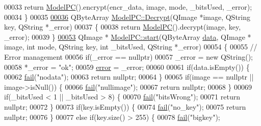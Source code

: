 \begin{DoxyCode}
00033     \textcolor{keywordflow}{return} \hyperlink{class_model_p_c_ae12ebe65ec973c02a0de4850a7c1e31c}{ModelPC}().encrypt(encr\_data, image, mode, \_bitsUsed, \_error);
00034 \}
00035 
\hypertarget{modelpc_8cpp_source_l00036}{}\hyperlink{class_model_p_c_ac245b9b6d618f421c0ccfa66d97ac905}{00036} QByteArray \hyperlink{class_model_p_c_ac245b9b6d618f421c0ccfa66d97ac905}{ModelPC::Decrypt}(QImage *image, QString key, QString *\_error)
00037 \{
00038     \textcolor{keywordflow}{return} \hyperlink{class_model_p_c_ae12ebe65ec973c02a0de4850a7c1e31c}{ModelPC}().decrypt(image, key, \_error);
00039 \}
\hypertarget{modelpc_8cpp_source_l00053}{}\hyperlink{class_model_p_c_a3cae34fd5bcb06e8c1f8cfe7961bd270}{00053} QImage * \hyperlink{class_model_p_c_a3cae34fd5bcb06e8c1f8cfe7961bd270}{ModelPC::start}(QByteArray \hyperlink{namespace_errors_dict_setup_adf4c30d205d29df7343e26f7c62b0685}{data}, QImage * image, \textcolor{keywordtype}{int} mode, QString key, \textcolor{keywordtype}{int} 
      \_bitsUsed, QString *\_error)
00054 \{
00055     \textcolor{comment}{// Error management}
00056     \textcolor{keywordflow}{if}(\_error == \textcolor{keyword}{nullptr})
00057         \_error = \textcolor{keyword}{new} QString();
00058     *\_error = \textcolor{stringliteral}{"ok"};
00059     \hyperlink{class_model_p_c_a4e5a9c0ca1f06fe5bc478b6bf248c37c}{error} = \_error;
00060 
00061     \textcolor{keywordflow}{if}(data.isEmpty()) \{
00062         \hyperlink{class_model_p_c_a47464b59b7e37fcee25e55475708aabd}{fail}(\textcolor{stringliteral}{"nodata"});
00063         \textcolor{keywordflow}{return} \textcolor{keyword}{nullptr};
00064     \}
00065     \textcolor{keywordflow}{if}(image == \textcolor{keyword}{nullptr} || image->isNull()) \{
00066         \hyperlink{class_model_p_c_a47464b59b7e37fcee25e55475708aabd}{fail}(\textcolor{stringliteral}{"nullimage"});
00067         \textcolor{keywordflow}{return} \textcolor{keyword}{nullptr};
00068     \}
00069     \textcolor{keywordflow}{if}(\_bitsUsed < 1 || \_bitsUsed > 8) \{
00070         \hyperlink{class_model_p_c_a47464b59b7e37fcee25e55475708aabd}{fail}(\textcolor{stringliteral}{"bitsWrong"});
00071         \textcolor{keywordflow}{return} \textcolor{keyword}{nullptr};
00072     \}
00073     \textcolor{keywordflow}{if}(key.isEmpty()) \{
00074         \hyperlink{class_model_p_c_a47464b59b7e37fcee25e55475708aabd}{fail}(\textcolor{stringliteral}{"no\_key"});
00075         \textcolor{keywordflow}{return} \textcolor{keyword}{nullptr};
00076     \}
00077     \textcolor{keywordflow}{else} \textcolor{keywordflow}{if}(key.size() > 255) \{
00078         \hyperlink{class_model_p_c_a47464b59b7e37fcee25e55475708aabd}{fail}(\textcolor{stringliteral}{"bigkey"});

\end{DoxyCode}
